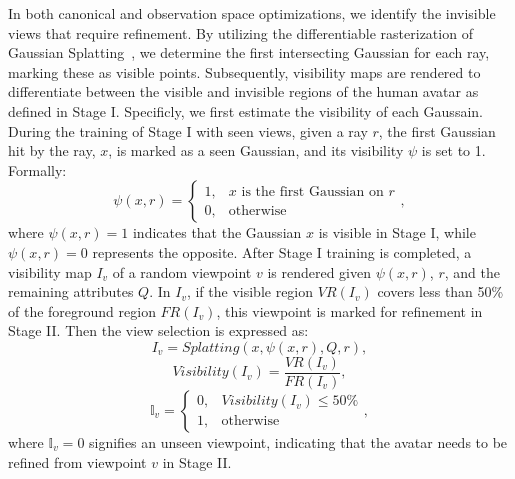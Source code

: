 In both canonical and observation space optimizations, we identify the invisible views that require refinement. By utilizing the differentiable rasterization of Gaussian Splatting~\cite{kerbl3Dgaussians}, we determine the first intersecting Gaussian for each ray, marking these as visible points. Subsequently, visibility maps are rendered to differentiate between the visible and invisible regions of the human avatar as defined in Stage I. Specificly, we first estimate the visibility of each Gaussain. During the training of Stage I with seen views, given a ray $r$, the first Gaussian hit by the ray, $x$, is marked as a seen Gaussian, and its visibility $\psi$ is set to 1. Formally:
\begin{equation}
    \psi(x, r) = \begin{cases} 1, & x \text{ is the first Gaussian on } r \\ 0, & \text{otherwise} \end{cases},
    \label{eq:viewSelection1}
\end{equation}
where $\psi(x, r) = 1$ indicates that the Gaussian $x$ is visible in Stage I, while $\psi(x, r) = 0$ represents the opposite. 
After Stage I training is completed, a visibility map $I_v$ of a random viewpoint $v$ is rendered given $\psi(x, r)$, $r$, and the remaining attributes $Q$. In $I_v$, if the visible region $VR(I_v)$ covers less than 50\% of the foreground region $FR(I_v)$, this viewpoint is marked for refinement in Stage II. Then the view selection is expressed as:
\begin{equation}
    I_v = Splatting \left( x, \psi(x, r) , Q, r \right),
    \label{eq:viewSelection2}
\end{equation}
\begin{equation}
    Visibility(I_v) = \frac{VR(I_v)}{FR(I_v)},
    \label{eq:viewSelection3}
\end{equation}
\begin{equation}
    \mathbb{I}_v = \begin{cases} 0, & Visibility(I_v) \leq 50\% \\ 1, & \text{otherwise} \end{cases}, 
    \label{eq:viewSelection4}
\end{equation} 
where $\mathbb{I}_v = 0$ signifies an unseen viewpoint, indicating that the avatar needs to be refined from viewpoint $v$ in Stage II.



